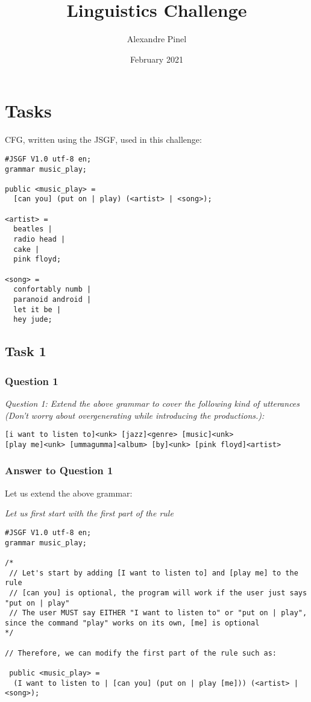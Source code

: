 \documentclass[12pt, a4paper]{article}
\title{Linguistics Challenge}
\author{Alexandre Pinel}
\date{February 2021}
\begin{document}
\maketitle

\section{Tasks}

CFG, written using the JSGF, used in this challenge: 

\begin{lstlisting}
#JSGF V1.0 utf-8 en;
grammar music_play;

public <music_play> =
  [can you] (put on | play) (<artist> | <song>);
  
<artist> =
  beatles |
  radio head |
  cake |
  pink floyd;
  
<song> =
  confortably numb |
  paranoid android |
  let it be |
  hey jude;
\end{lstlisting}

\subsection{Task 1}

\subsubsection{Question 1}

\emph{Question 1: Extend the above grammar to cover the following kind of utterances (Don’t worry about overgenerating while introducing the productions.):}\\

\begin{lstlisting}
[i want to listen to]<unk> [jazz]<genre> [music]<unk>
[play me]<unk> [ummagumma]<album> [by]<unk> [pink floyd]<artist>
\end{lstlisting}

\subsubsection{Answer to Question 1}

Let us extend the above grammar: 

\emph{Let us first start with the first part of the rule}

\begin{lstlisting}
#JSGF V1.0 utf-8 en;
grammar music_play;

/*
 // Let's start by adding [I want to listen to] and [play me] to the rule
 // [can you] is optional, the program will work if the user just says "put on | play"
 // The user MUST say EITHER "I want to listen to" or "put on | play", since the command "play" works on its own, [me] is optional
*/

// Therefore, we can modify the first part of the rule such as: 

 public <music_play> =
  (I want to listen to | [can you] (put on | play [me])) (<artist> | <song>);
\end{lstlisting}
\end{document}
